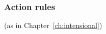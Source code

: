\begin{description}
  

      

  


\end{description}



\subsubsection{Action rules} (as in Chapter~\ref{ch:intensional})


  






  



